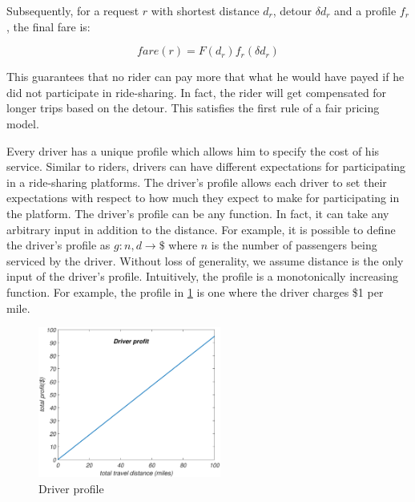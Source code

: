 Subsequently, for a request $r$ with shortest distance $d_r$, detour $\delta d_r$ and a profile $f_r$, the final fare is:

\begin{equation}
\label{eq:fare}
fare(r) = F(d_r) f_r(\delta d_r)
\end{equation}

\noindent This guarantees that no rider can pay more that what he would have payed if he did not participate in ride-sharing. In fact, the rider will get compensated for longer trips based on the detour. This satisfies the first rule of a fair pricing model.

Every driver has a unique profile which allows him to specify the cost of his service. Similar to riders, drivers can have different expectations for participating in a ride-sharing platforms. The driver's profile allows each driver to set their expectations with respect to how much they expect to make for participating in the platform. The driver's profile can be any function. In fact, it can take any arbitrary input in addition to the distance. For example, it is possible to define the driver's profile as $g: n, d \rightarrow \$$ where $n$ is the number of passengers being serviced by the driver. Without loss of generality, we assume distance is the only input of the driver's profile. Intuitively, the profile is a monotonically increasing function. For example, the profile in \cref{fig:driver_profile} is one where the driver charges \$1 per mile.

\begin{figure}[!ht]
	\centering
	\includegraphics[width = 60mm]{fig/driver.eps}
	\vspace{-0mm}\caption{Driver profile} \vspace{-2mm} \label{fig:driver_profile}
\end{figure}\vspace{-0mm}
 
